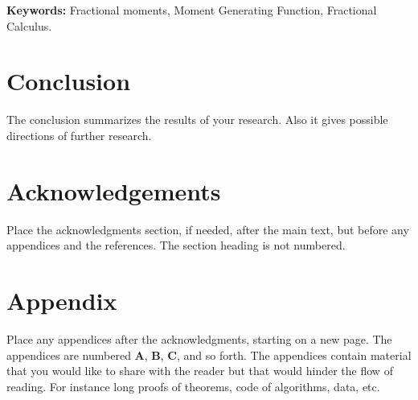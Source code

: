 \documentclass[a4paper,11pt]{article}
\theoremstyle{plain}
\numberwithin{theorem}{subsection}
\numberwithin{corollary}{subsection}
\numberwithin{proposition}{subsection}
\numberwithin{lemma}{subsection}
\numberwithin{assumption}{subsection}
\theoremstyle{definition}
\numberwithin{definition}{subsection}
\numberwithin{example}{subsection}
\numberwithin{remark}{subsection}
\numberwithin{notation}{subsection}
\begin{document}
\bigskip\noindent
\textbf{Keywords:} Fractional moments, Moment Generating Function, Fractional Calculus.




%





\section{Conclusion}\label{s:con}
The conclusion summarizes the results of your research.
Also it gives possible directions of further research.

\section*{Acknowledgements}
Place the acknowledgments section, if needed, after the main text, 
but before any appendices and the references. The section heading is not numbered.

\appendix


\section{Appendix}\label{s:app1}
Place any appendices after the acknowledgments, starting on a new page.
The appendices are numbered
\textbf{A}, \textbf{B}, \textbf{C}, and so forth.
The appendices contain material that you would like to share with the
reader but that would hinder the flow of reading. For instance long
proofs of theorems, code of algorithms, data, etc.




\end{document}
